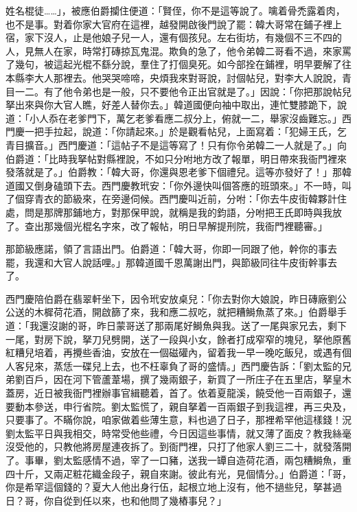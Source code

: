 姓名棍徒……」，被應伯爵攔住便道：「賢侄，你不是這等說了。噙着骨禿露着肉，也不是事。對着你家大官府在這裡，越發開啟後門說了罷：{}韓大哥常在鋪子裡上宿，家下沒人，止是他娘子兒一人，還有個孩兒。左右街坊，有幾個不三不四的人，見無人在家，時常打磚掠瓦鬼混。欺負的急了，他令弟韓二哥看不過，來家罵了幾句，被這起光棍不繇分說，羣住了打個臭死。如今部拴在鋪裡，明早要解了往本縣李大人那裡去。他哭哭啼啼，央煩我來對哥說，討個帖兒，對李大人說說，青目一二。有了他令弟也是一般，只不要他令正出官就是了。」因說：「你把那說帖兒拏出來與你大官人瞧，好差人替你去。」韓道國便向袖中取出，連忙雙膝跪下，說道：「小人忝在老爹門下，萬乞老爹看應二叔分上，俯就一二，舉家沒齒難忘。」西門慶一把手拉起，說道：「你請起來。」於是觀看帖兒，上面寫着：「犯婦王氏，乞青目擴音。」西門慶道：「這帖子不是這等寫了！只有你令弟韓二一人就是了。」向伯爵道：「比時我拏帖對縣裡說，不如只分咐地方改了報單，明日帶來我衙門裡來發落就是了。」{}伯爵教：「韓大哥，你還與恩老爹下個禮兒。這等亦發好了！」那韓道國又倒身磕頭下去。西門慶教玳安：「你外邊快叫個答應的班頭來。」不一時，叫了個穿青衣的節級來，在旁邊伺候。西門慶叫近前，分咐：「你去牛皮街韓夥計住處，問是那牌那鋪地方，對那保甲說，就稱是我的鈞語，分咐把王氏即時與我放了。查出那幾個光棍名字來，改了報帖，明日早解提刑院，我衙門裡聽審。」

那節級應諾，領了言語出門。伯爵道：「韓大哥，你即一同跟了他，幹你的事去罷，我還和大官人說話哩。」那韓道國千恩萬謝出門，與節級同往牛皮街幹事去了。

西門慶陪伯爵在翡翠軒坐下，因令玳安放桌兒：「你去對你大娘說，昨日磚廠劉公公送的木樨荷花酒，開啟篩了來，我和應二叔吃，就把糟鰣魚蒸了來。」伯爵舉手道：「我還沒謝的哥，昨日蒙哥送了那兩尾好鰣魚與我。送了一尾與家兄去，剩下一尾，對房下說，拏刀兒劈開，送了一段與小女，餘者打成窄窄的塊兒，拏他原舊紅糟兒培着，再攪些香油，安放在一個磁礶內，留着我一早一晚吃飯兒，或遇有個人客兒來，蒸恁一碟兒上去，也不枉辜負了哥的盛情。」西門慶告訴：「劉太監的兄弟劉百戶，因在河下管蘆葦場，撰了幾兩銀子，新買了一所庄子在五里店，拏皇木蓋房，近日被我衙門裡辦事官緝聽着，首了。依着夏龍溪，饒受他一百兩銀子，還要動本參送，申行省院。劉太監慌了，親自拏着一百兩銀子到我這裡，再三央及，只要事了。不瞞你說，咱家做着些薄生意，料也過了日子，那裡希罕他這樣錢！況劉太監平日與我相交，時常受他些禮，今日因這些事情，就又薄了面皮？{}教我絲毫沒受他的，只教他將房屋連夜拆了。到衙門裡，只打了他家人劉三二十，就發落開了。事畢，劉太監感情不過，宰了一口豬，送我一罈自造荷花酒，兩包糟鰣魚，重四十斤，又兩疋粧花織金段子，親自來謝。彼此有光，見個情分。」伯爵道：「哥，你是希罕這個錢的？夏大人他出身行伍，起根立地上沒有，他不撾些兒，拏甚過日？哥，你自從到任以來，也和他問了幾樁事兒？」


